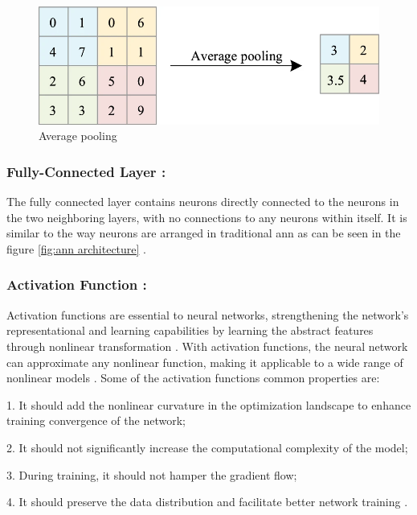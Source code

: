 \begin{figure}[H]
    \centering
    \includegraphics[width=1\linewidth]{Rohit_Master_Thesis//Images/average_pooling.png}
    \caption{Average pooling \cite{Zhao2024}}
    \label{fig:average pooling}
\end{figure}

\subsubsection*{Fully-Connected Layer :}

The fully connected layer contains neurons directly connected to the neurons in the two neighboring layers, with no connections to any neurons within itself. It is similar to the way neurons are arranged in traditional \gls{ann} as can be seen in the figure \ref{fig:ann architecture} \cite{oshea2015introductionconvolutionalneuralnetworks}.

\subsubsection*{Activation Function :}

Activation functions are essential to neural networks, strengthening the network's representational and learning capabilities by learning the abstract features through nonlinear transformation \cite{dubey2022activationfunctionsdeeplearning}. With activation functions, the neural network can approximate any nonlinear function, making it applicable to a wide range of nonlinear models \cite{Zhao2024}. Some of the activation functions common properties are:

1. It should add the nonlinear curvature in the optimization landscape to enhance training convergence of the network;

2. It should not significantly increase the computational complexity of the model;

3. During training, it should not hamper the gradient flow;

4. It should preserve the data distribution and facilitate better network training \cite{dubey2022activationfunctionsdeeplearning}.

